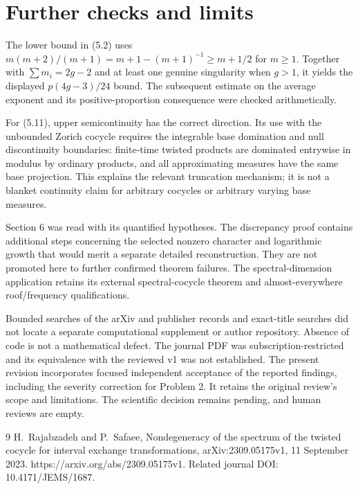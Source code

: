 \documentclass[10pt]{article}
\begin{document}
\section*{Further checks and limits}
The lower bound in (5.2) uses \(m(m+2)/(m+1)=m+1-(m+1)^{-1}\ge m+1/2\) for \(m\ge1\). Together with \(\sum m_i=2g-2\) and at least one genuine singularity when \(g>1\), it yields the displayed \(p(4g-3)/24\) bound. The subsequent estimate on the average exponent and its positive-proportion consequence were checked arithmetically.\par
For (5.11), upper semicontinuity has the correct direction. Its use with the unbounded Zorich cocycle requires the integrable base domination and null discontinuity boundaries: finite-time twisted products are dominated entrywise in modulus by ordinary products, and all approximating measures have the same base projection. This explains the relevant truncation mechanism; it is not a blanket continuity claim for arbitrary cocycles or arbitrary varying base measures.\par
Section 6 was read with its quantified hypotheses. The discrepancy proof contains additional steps concerning the selected nonzero character and logarithmic growth that would merit a separate detailed reconstruction. They are not promoted here to further confirmed theorem failures. The spectral-dimension application retains its external spectral-cocycle theorem and almost-everywhere roof/frequency qualifications.\par
Bounded searches of the arXiv and publisher records and exact-title searches did not locate a separate computational supplement or author repository. Absence of code is not a mathematical defect. The journal PDF was subscription-restricted and its equivalence with the reviewed v1 was not established. The present revision incorporates focused independent acceptance of the reported findings, including the severity correction for Problem 2. It retains the original review’s scope and limitations. The scientific decision remains pending, and human reviews are empty.\par
9 H. Rajabzadeh and P. Safaee, Nondegeneracy of the spectrum of the twisted cocycle for interval exchange transformations, arXiv:2309.05175v1, 11 September 2023. https://arxiv.org/abs/2309.05175v1. Related journal DOI: 10.4171/JEMS/1687.\par
\end{document}
